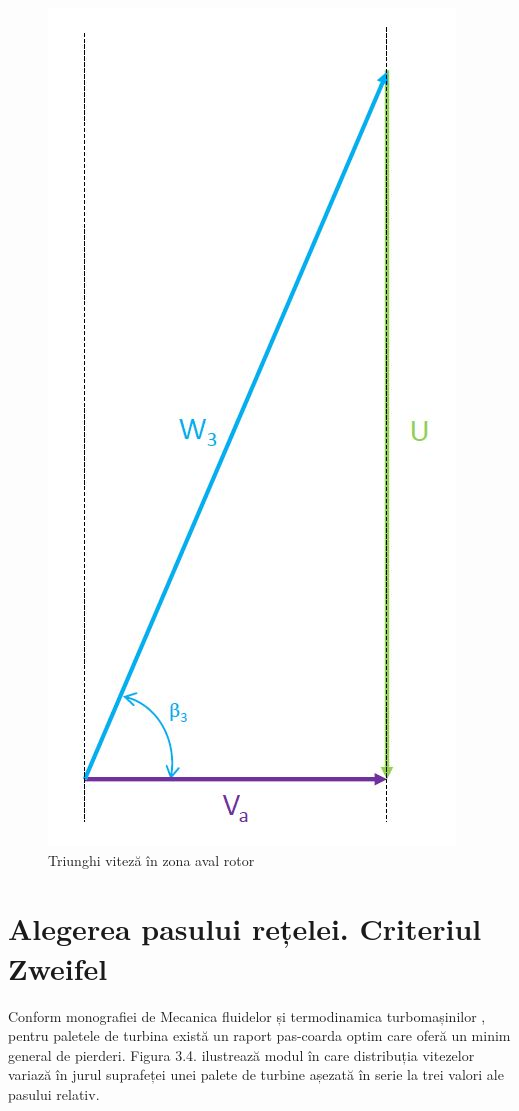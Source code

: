 \begin{figure}[h]
	\centering
	\includegraphics[scale=0.6]{figures/triunghi_viteza_ZAR.jpg}
	\caption{Triunghi viteză în zona aval rotor}
	\label{Triunghi viteză în zona aval rotor}
\end{figure}

\clearpage

\section{Alegerea pasului rețelei. Criteriul Zweifel}

Conform monografiei de Mecanica fluidelor și termodinamica turbomașinilor \cite{hall2013fluid}, pentru paletele de turbina există un raport pas-coarda optim care oferă un minim general de pierderi. Figura 3.4. ilustrează modul în care distribuția vitezelor variază în jurul suprafeței unei palete de turbine așezată în serie la trei valori ale pasului relativ.

